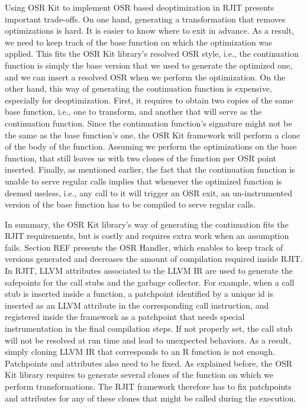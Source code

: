 
Using OSR Kit to implement OSR based deoptimization in RJIT presents important trade-offs.
On one hand, generating a transformation that removes optimizations is hard.
It is easier to know where to exit in advance.
As a result, we need to keep track of the base function on which the optimization was applied. 
This fits the OSR Kit library's resolved OSR style, i.e., the continuation function is simply the base version that we used to generate the optimized one, and we can insert a resolved OSR when we perform the optimization.
On the other hand, this way of generating the continuation function is expensive, especially for deoptimization.
First, it requires to obtain two copies of the same base function, i.e., one to transform, and another that will serve as the continuation function.
Since the continuation function's signature might not be the same as the base function's one, the OSR Kit framework will perform a clone of the body of the function. 
Assuming we perform the optimizations on the base function, that still leaves us with two clones of the function per OSR point inserted.
Finally, as mentioned earlier, the fact that the continuation function is unable to serve regular calls implies that whenever the optimized function is deemed useless, i.e., any call to it will trigger an OSR exit, an un-instrumented version of the base function has to be compiled to serve regular calls.

In summary, the OSR Kit library's way of generating the continuation fits the RJIT requirements, but is costly and requires extra work when an assumption fails.
Section REF presents the OSR Handler, which enables to keep track of versions generated and decreases the amount of compilation required inside RJIT.\\

In RJIT, LLVM attributes\cite{llvmAttribute} associated to the LLVM IR are used to generate the safepoints for the call stubs and the garbage collector.
For example, when a call stub is inserted inside a function, a patchpoint identified by a unique id is inserted as an LLVM attribute in the corresponding call instruction, and registered inside the framework as a patchpoint that needs special instrumentation in the final compilation steps.
If not properly set, the call stub will not be resolved at run time and lead to unexpected behaviors.
As a result, simply cloning LLVM IR that corresponds to an R function is not enough.
Patchpoints and attributes also need to be fixed. 
As explained before, the OSR Kit library requires to generate several clones of the function on which we perform transformations. 
The RJIT framework therefore has to fix patchpoints and attributes for any of these clones that might be called during the execution.\\

